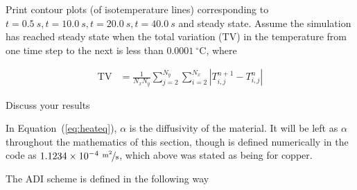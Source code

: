 \documentclass[addpoints]{exam}
\begin{document}
\begin{questions}
Print contour plots (of isotemperature lines) corresponding to $t=0.5\ s, t=10.0\ s, t=20.0\ s, t=40.0\ s$ and steady state. Assume the simulation has reached steady state when the total variation (TV) in the temperature from one time step to the next is less than $0.0001\ ^{\circ}\text{C}$, where

\begin{align}
\text{TV} &= \frac{1}{N_{x}N_{y}}\sum_{j=2}^{N_{y}}\sum_{i=2}^{N_{x}}\left| T_{i,j}^{n+1}-T_{i,j}^{n}\right|\label{eq:steady_state}
\end{align}

Discuss your results

\begin{solution}
In Equation~(\ref{eq:heateq}), $\alpha$ is the diffusivity of the material. It will be left as $\alpha$ throughout the mathematics of this section, though is defined numerically in the code as $1.1234\times 10^{-4}\ \unitfrac{m^{2}}{s}$, which above was stated as being for copper.

The ADI scheme is defined in the following way


\end{solution}
\end{questions}
\end{document}
